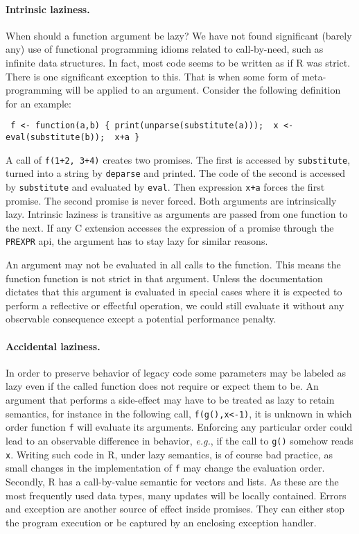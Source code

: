 \documentclass[review,nonacm,screen,acmsmall,anonymous=true]{acmart}
\newcommand{\code}[1]{\lstinline |#1|\xspace}
\renewcommand{\c}[1]{\lstinline |#1|\xspace}
\newcommand{\eg}{\emph{e.g.},\xspace}
\begin{document}
\paragraph{Intrinsic laziness.} When should a function argument be lazy?
We have not found significant (barely any) use of functional programming idioms
related to call-by-need, such as infinite data structures. In fact, most code
seems to be written as if R was strict. There is one significant exception to
this. That is when some form of meta-programming will be applied to an argument.
Consider the following definition for an example:
\begin{lstlisting}
 f <- function(a,b) { print(unparse(substitute(a)));  x <- eval(substitute(b));  x+a }
\end{lstlisting}

\medskip
\noindent
A call of \c{f(1+2, 3+4)} creates two promises. The first is accessed by
\c{substitute}, turned into a string by \c{deparse} and printed. The code of the
second is accessed by \c{substitute} and evaluated by \c{eval}. Then expression
\c{x+a} forces the first promise. The second promise is never forced. Both
arguments are intrinsically lazy. Intrinsic laziness is transitive as arguments
are passed from one function to the next. If any C extension accesses the
expression of a promise through the \code{PREXPR} api, the argument has to stay
lazy for similar reasons.

An argument may not be evaluated in all calls to the function. This means the
function function is not strict in that argument. Unless the documentation
dictates that this argument is evaluated in special cases where it is expected
to perform a reflective or effectful operation, we could still evaluate it
without any observable consequence except a potential performance penalty.

\paragraph{Accidental laziness.} In order to preserve behavior of legacy code
some parameters may be labeled as lazy even if the called function does not
require or expect them to be. An argument that performs a side-effect may have
to be treated as lazy to retain semantics, for instance in the following call,
\c{f(g(),x<-1)}, it is unknown in which order function \c f will evaluate its
arguments. Enforcing any particular order could lead to an observable
difference in behavior, \eg if the call to \c{g()} somehow reads \c{x}.
Writing such code in R, under lazy semantics, is of course bad practice,
as small changes in the implementation of \c f may change the evaluation order.
Secondly, R has a call-by-value semantic for vectors and lists. As these are
the most frequently used data types, many updates will be locally contained.
Errors and exception are another source of effect inside promises. They can
either stop the program execution or be captured by an enclosing exception
handler.
\end{document}
